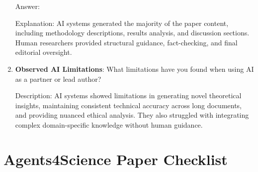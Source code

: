 \documentclass[11pt]{article}
\begin{document}
\begin{enumerate}
    Answer: \involvementC{} 
     
    Explanation: AI systems generated the majority of the paper content, including methodology descriptions, results analysis, and discussion sections. Human researchers provided structural guidance, fact-checking, and final editorial oversight.

    \item \textbf{Observed AI Limitations}: What limitations have you found when using AI as a partner or lead author? 
      
    Description: AI systems showed limitations in generating novel theoretical insights, maintaining consistent technical accuracy across long documents, and providing nuanced ethical analysis. They also struggled with integrating complex domain-specific knowledge without human guidance.
\end{enumerate}

\newpage

\section*{Agents4Science Paper Checklist}
\end{document}
